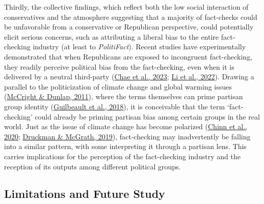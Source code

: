 \documentclass[
  12pt,
]{article}
\begin{document}
Thirdly, the collective findings, which reflect both the low social
interaction of conservatives and the atmosphere suggesting that a
majority of fact-checks could be unfavorable from a conservative or
Republican perspective, could potentially elicit serious concerns, such
as attributing a liberal bias to the entire fact-checking industry (at
least to \emph{PolitiFact}). Recent studies have experimentally
demonstrated that when Republicans are exposed to incongruent
fact-checking, they readily perceive political bias from the
fact-checking, even when it is delivered by a neutral third-party
(\protect\hyperlink{ref-chae2023perceiving}{Chae et al., 2023};
\protect\hyperlink{ref-li2022power}{Li et al., 2022}). Drawing a
parallel to the politicization of climate change and global warming
issues (\protect\hyperlink{ref-mccright2011politicization}{McCright \&
Dunlap, 2011}), where the terms themselves can prime partisan group
identity (\protect\hyperlink{ref-guilbeault2018social}{Guilbeault et
al., 2018}), it is conceivable that the term `fact-checking' could
already be priming partisan bias among certain groups in the real world.
Just as the issue of climate change has become polarized
(\protect\hyperlink{ref-chinn2020politicization}{Chinn et al., 2020};
\protect\hyperlink{ref-druckman2019evidence}{Druckman \& McGrath,
2019}), fact-checking may inadvertently be falling into a similar
pattern, with some interpreting it through a partisan lens. This carries
implications for the perception of the fact-checking industry and the
reception of its outputs among different political groups.

\hypertarget{limitations-and-future-study}{%
\subsection{Limitations and Future
Study}\label{limitations-and-future-study}}
\end{document}
